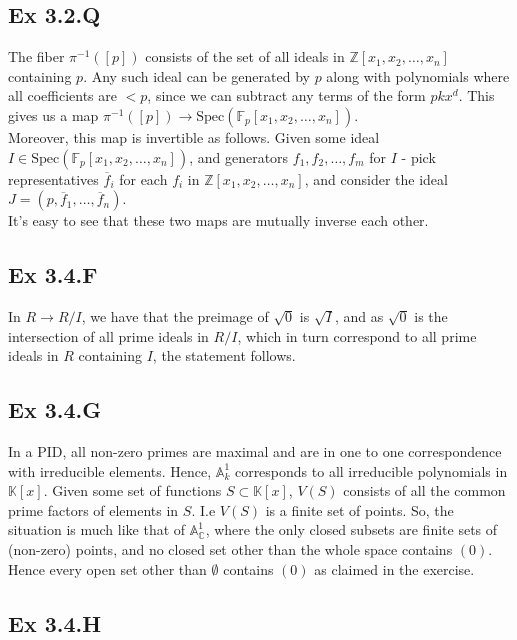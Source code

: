 \documentclass{article}
\theoremstyle{definition}
\newcommand{\Z}{\mathbb{Z}}
\newcommand{\C}{\mathbb{C}}
\newcommand{\K}{\mathbb{K}}
\newcommand{\F}{\mathbb{F}}
\newcommand{\A}{\mathbb{A}}
\newcommand{\Spec}{\text{Spec}}
\newcommand{\spec}{\Spec}
\begin{document}
\subsection*{Ex 3.2.Q}

The fiber $\pi^{-1}([p])$ consists of the set of all ideals in $\Z[x_1, x_2,
		\ldots, x_n]$ containing $p$. Any such ideal can be generated by $p$ along with
polynomials where all coefficients are $< p$, since we can subtract any terms
of the form $pk x^d$. This gives us a map $\pi^{-1}([p]) \to \spec(\F_p[x_1,
		x_2, \ldots, x_n])$. \\

Moreover, this map is invertible as follows. Given some ideal $I \in
	\spec(\F_p[x_1, x_2, \ldots, x_n])$, and generators $f_1, f_2, \ldots, f_m$ for
$I$ - pick representatives $\overline{f}_i$ for each $f_i$ in $\Z[x_1, x_2,
		\ldots, x_n]$, and consider the ideal $J = (p, \overline{f}_1, \ldots,
	\overline{f}_n)$. \\

It's easy to see that these two maps are mutually inverse each other.

\subsection*{Ex 3.4.F}

In $R \to R/I$, we have that the preimage of $\sqrt{0}$ is $\sqrt{I}$, and as
$\sqrt{0}$ is the intersection of all prime ideals in $R/I$, which in turn
correspond to all prime ideals in $R$ containing $I$, the statement follows.

\subsection*{Ex 3.4.G}

In a PID, all non-zero primes are maximal and are in one to one correspondence
with irreducible elements. Hence, $\A^1_k$ corresponds to all irreducible
polynomials in $\K[x]$. Given some set of functions $S \subset \K[x]$, $V(S)$
consists of all the common prime factors of elements in $S$. I.e $V(S)$ is a
finite set of points. So, the situation is much like that of $\A^1_{\C}$, where
the only closed subsets are finite sets of (non-zero) points, and no closed set
other than the whole space contains $(0)$. Hence every open set other than
$\emptyset$ contains $(0)$ as claimed in the exercise.

\subsection*{Ex 3.4.H}
\end{document}
